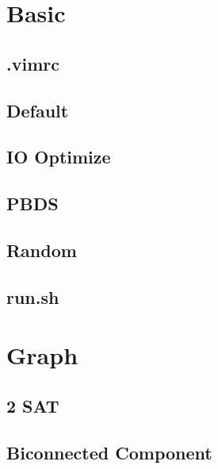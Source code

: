 \documentclass[a4paper,10pt,twocolumn,oneside]{article}
\begin{document}
\pagestyle{fancy}
\fancyfoot{}
\fancyhead[R]{\thepage}
\renewcommand{\headrulewidth}{0.4pt}
\renewcommand{\contentsname}{Contents} 

\scriptsize
\tableofcontents


\section{Basic}
\subsection{.vimrc}


\subsection{Default}


\subsection{IO Optimize}


\subsection{PBDS}


\subsection{Random}


\subsection{run.sh}


\section{Graph}
\subsection{2 SAT}


\subsection{Biconnected Component}

\end{document}
